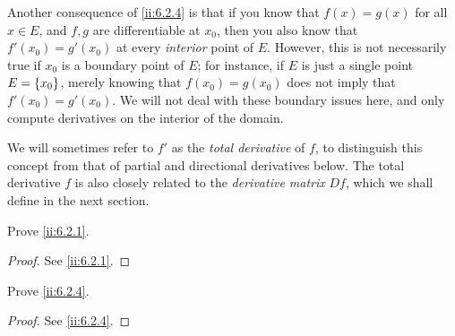 \begin{note}
  Another consequence of \cref{ii:6.2.4} is that if you know that \(f(x) = g(x)\) for all \(x \in E\), and \(f, g\) are differentiable at \(x_0\), then you also know that \(f'(x_0) = g'(x_0)\) at every \emph{interior} point of \(E\).
  However, this is not necessarily true if \(x_0\) is a boundary point of \(E\);
  for instance, if \(E\) is just a single point \(E = \left\lbrace x_0\right\rbrace\), merely knowing that \(f(x_0) = g(x_0)\) does not imply that \(f'(x_0) = g'(x_0)\).
  We will not deal with these boundary issues here, and only compute derivatives on the interior of the domain.
\end{note}

\begin{note}
  We will sometimes refer to \(f'\) as the \emph{total derivative} of \(f\), to distinguish this concept from that of partial and directional derivatives below.
  The total derivative \(f\) is also closely related to the \emph{derivative matrix} \(Df\),
  which we shall define in the next section.
\end{note}

\exercisesection

\begin{ex}\label{ii:ex:6.2.1}
  Prove \cref{ii:6.2.1}.
\end{ex}

\begin{proof}
  See \cref{ii:6.2.1}.
\end{proof}

\begin{ex}\label{ii:ex:6.2.2}
  Prove \cref{ii:6.2.4}.
\end{ex}

\begin{proof}
  See \cref{ii:6.2.4}.
\end{proof}
